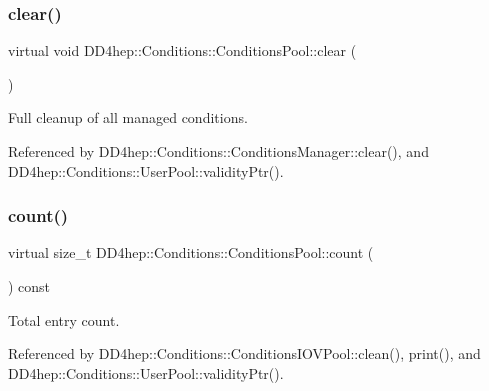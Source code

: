 \subsubsection{\texorpdfstring{clear()}{clear()}}
{\footnotesize\ttfamily virtual void D\+D4hep\+::\+Conditions\+::\+Conditions\+Pool\+::clear (\begin{DoxyParamCaption}{ }\end{DoxyParamCaption})\hspace{0.3cm}{\ttfamily [pure virtual]}}



Full cleanup of all managed conditions. 



Referenced by D\+D4hep\+::\+Conditions\+::\+Conditions\+Manager\+::clear(), and D\+D4hep\+::\+Conditions\+::\+User\+Pool\+::validity\+Ptr().

\hypertarget{class_d_d4hep_1_1_conditions_1_1_conditions_pool_a40326e9b162960c46e69cbdb451526d0}{}\label{class_d_d4hep_1_1_conditions_1_1_conditions_pool_a40326e9b162960c46e69cbdb451526d0} 
\subsubsection{\texorpdfstring{count()}{count()}}
{\footnotesize\ttfamily virtual size\+\_\+t D\+D4hep\+::\+Conditions\+::\+Conditions\+Pool\+::count (\begin{DoxyParamCaption}{ }\end{DoxyParamCaption}) const\hspace{0.3cm}{\ttfamily [pure virtual]}}



Total entry count. 



Referenced by D\+D4hep\+::\+Conditions\+::\+Conditions\+I\+O\+V\+Pool\+::clean(), print(), and D\+D4hep\+::\+Conditions\+::\+User\+Pool\+::validity\+Ptr().

\hypertarget{class_d_d4hep_1_1_conditions_1_1_conditions_pool_aa37de3a69489da065b3515c7119b3145}{}\label{class_d_d4hep_1_1_conditions_1_1_conditions_pool_aa37de3a69489da065b3515c7119b3145} 
